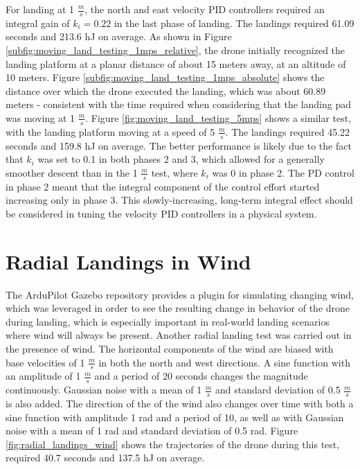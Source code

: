 For landing at 1 $\frac{m}{s}$, the north and east velocity PID controllers required an integral gain of $k_i=0.22$ in the last phase of landing. The landings required 61.09 seconds and 213.6 hJ on average. As shown in Figure \ref{subfig:moving_land_testing_1mps_relative}, the drone initially recognized the landing platform at a planar distance of about 15 meters away, at an altitude of 10 meters. Figure \ref{subfig:moving_land_testing_1mps_absolute} shows the distance over which the drone executed the landing, which was about 60.89 meters - consistent with the time required when considering that the landing pad was moving at 1 $\frac{m}{s}$. Figure \ref{fig:moving_land_testing_5mps} shows a similar test, with the landing platform moving at a speed of 5 $\frac{m}{s}$. The landings required 45.22 seconds and 159.8 hJ on average. The better performance is likely due to the fact that $k_i$ was set to 0.1 in both phases 2 and 3, which allowed for a generally smoother descent than in the 1 $\frac{m}{s}$ test, where $k_i$ was 0 in phase 2. The PD control in phase 2 meant that the integral component of the control effort started increasing only in phase 3. This slowly-increasing, long-term integral effect should be considered in tuning the velocity PID controllers in a physical system. 

\section{Radial Landings in Wind}
\label{section:radial_landings_wind}

The ArduPilot Gazebo repository provides a plugin for simulating changing wind, which was leveraged in order to see the resulting change in behavior of the drone during landing, which is especially important in real-world landing scenarios where wind will always be present. Another radial landing test was carried out in the presence of wind. The horizontal components of the wind are biased with base velocities of 1 $\frac{m}{s}$ in both the north and west directions. A sine function with an amplitude of 1 $\frac{m}{s}$ and a period of 20 seconds changes the magnitude continuously. Gaussian noise with a mean of 1 $\frac{m}{s}$ and standard deviation of 0.5 $\frac{m}{s}$ is also added. The direction of the of the wind also changes over time with both a sine function with amplitude 1 rad and a period of 10, as well as with Gaussian noise with a mean of 1 rad and standard deviation of 0.5 rad. Figure \ref{fig:radial_landings_wind} shows the trajectories of the drone during this test, required 40.7 seconds and 137.5 hJ on average. 

